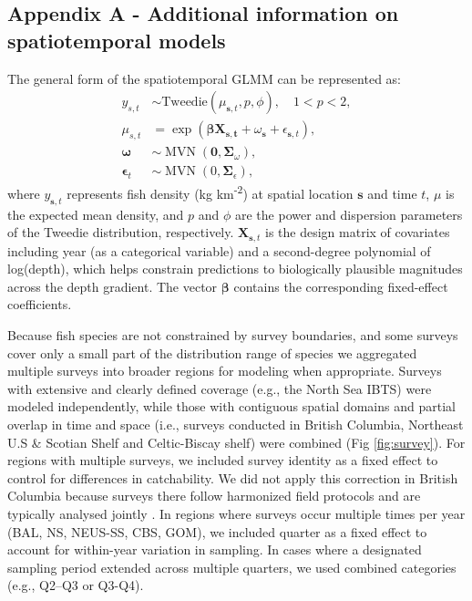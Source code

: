 \documentclass[pdflatex,sn-nature,referee]{sn-jnl}%
\begin{document}
\begin{bibunit} %
\subsection*{Appendix A - Additional information on spatiotemporal models}\label{sec:A}

The general form of the spatiotemporal GLMM can be represented as:
\begin{align}
    y_{s,t} &\sim \text{Tweedie} \left( \mu_{\mathbf{s},t}, p, \phi \right), \quad 1 < p < 2, \label{eq:1} \\
    \mu_{s,t} &= \exp \left(\boldsymbol{\beta} \boldsymbol{\text{X}_{\boldsymbol{s},t}}  + \omega_{\boldsymbol{s}} + \epsilon_{\boldsymbol{s},t} \right), \label{eq:2} \\
    \boldsymbol{\omega} &\sim \operatorname{MVN} \left(\boldsymbol{0}, \boldsymbol{\Sigma}_{\omega} \right), \label{eq:3} \\
    \boldsymbol{\epsilon}_{t} &\sim \operatorname{MVN} \left(0, \boldsymbol{\Sigma}_{\epsilon} \right), \label{eq:4}
\end{align}
where \( y_{\mathbf{s},t} \) represents fish density (kg km\textsuperscript{-2}) at spatial location \( \mathbf{s} \) and time \( t \), \( \mu \) is the expected mean density, and \( p \) and \( \phi \) are the power and dispersion parameters of the Tweedie distribution, respectively. \( \mathbf{X}_{\mathbf{s},t} \) is the design matrix of covariates including year (as a categorical variable) and a second-degree polynomial of log(depth), which helps constrain predictions to biologically plausible magnitudes across the depth gradient. The vector \( \boldsymbol{\beta} \) contains the corresponding fixed-effect coefficients.

Because fish species are not constrained by survey boundaries, and some surveys cover only a small part of the distribution range of species we aggregated multiple surveys into broader regions for modeling when appropriate. Surveys with extensive and clearly defined coverage (e.g., the North Sea IBTS) were modeled independently, while those with contiguous spatial domains and partial overlap in time and space (i.e., surveys conducted in British Columbia, Northeast U.S \& Scotian Shelf and Celtic-Biscay shelf) were combined (Fig \ref{fig:survey}). For regions with multiple surveys, we included survey identity as a fixed effect to control for differences in catchability. We did not apply this correction in British Columbia because surveys there follow harmonized field protocols and are typically analysed jointly \citep[e.g.,][]{Anderson2019BCGroundfish, WardWin2024}. In regions where surveys occur multiple times per year (BAL, NS, NEUS-SS, CBS, GOM), we included quarter as a fixed effect to account for within-year variation in sampling. In cases where a designated sampling period extended across multiple quarters, we used combined categories (e.g., Q2–Q3 or Q3-Q4).


\end{bibunit}
\end{document}
